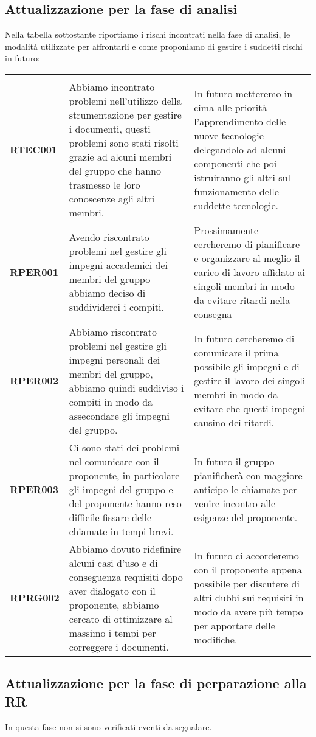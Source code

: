 \documentclass[../piano-di-progetto]{subfiles}
\begin{document}
\subsection{Attualizzazione per la fase di analisi}%
\label{sub:attualizzazione_fase_analisi}
Nella tabella sottostante riportiamo i rischi incontrati nella fase di analisi, le modalità utilizzate per affrontarli e come proponiamo di gestire i suddetti rischi in futuro:
\begin{table}[H]%
  \label{tab:registro_delle_modifiche}

  \centering

  \begin{longtable}[H]{|p{10em}|p{17em}|p{17em}|}
    \rowcolor{darkgray!90!}\color{white}{\textbf{Rischio}} & \color{white}{\textbf{Gestione}} & \color{white}{\textbf{Monitoraggio}} \\
    \textbf{RTEC001} & Abbiamo incontrato problemi nell'utilizzo della strumentazione per gestire i documenti, questi problemi sono stati risolti grazie ad alcuni membri del gruppo che hanno trasmesso le loro conoscenze agli altri membri. & In futuro metteremo in cima alle priorità l'apprendimento delle nuove tecnologie delegandolo ad alcuni componenti che poi istruiranno gli altri sul funzionamento delle suddette tecnologie.\\
    \textbf{RPER001} & Avendo riscontrato problemi nel gestire gli impegni accademici dei membri del gruppo abbiamo deciso di suddividerci i compiti. & Prossimamente cercheremo di pianificare e organizzare al meglio il carico di lavoro affidato ai singoli membri in modo da evitare ritardi nella consegna\\
    \textbf{RPER002} & Abbiamo riscontrato problemi nel gestire gli impegni personali dei membri del gruppo, abbiamo quindi suddiviso i compiti in modo da assecondare gli impegni del gruppo. & In futuro cercheremo di comunicare il prima possibile gli impegni e di gestire il lavoro dei singoli membri in modo da evitare che questi impegni causino dei ritardi.\\
    \textbf{RPER003} & Ci sono stati dei problemi nel comunicare con il proponente, in particolare gli impegni del gruppo e del proponente hanno reso difficile fissare delle chiamate in tempi brevi. & In futuro il gruppo pianificherà con maggiore anticipo le chiamate per venire incontro alle esigenze del proponente.\\
    \textbf{RPRG002} & Abbiamo dovuto ridefinire alcuni casi d'uso e di conseguenza requisiti dopo aver dialogato con il proponente, abbiamo cercato di ottimizzare al massimo i tempi per correggere i documenti. & In futuro ci accorderemo con il proponente appena possibile per discutere di altri dubbi sui requisiti in modo da avere più tempo per apportare delle modifiche.\\
    \hline
  \end{longtable}
\end{table}
\subsection{Attualizzazione per la fase di perparazione alla RR}%
\label{sub:attualizzazione_fase_prep_RR}
In questa fase non si sono verificati eventi da segnalare.
\end{document}
